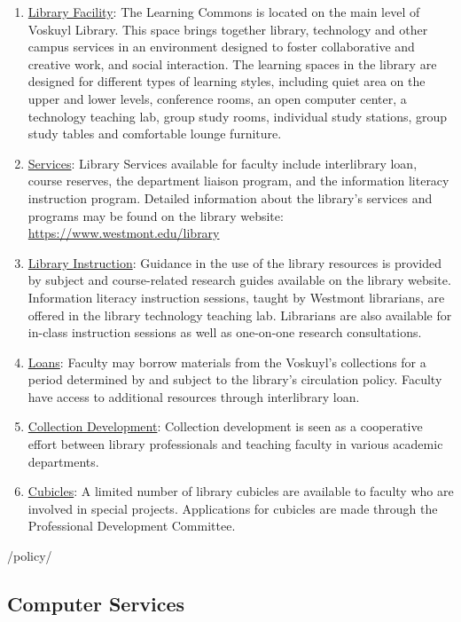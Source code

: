 		\begin{enumerate}[label=\alph*)]
			\item{\underline{Library Facility}:  The Learning Commons is located on the main level of Voskuyl Library.  This space brings together library, technology and other campus services in an environment designed to foster collaborative and creative work, and social interaction.  The learning spaces in the library are designed for different types of learning styles, including quiet area on the upper and lower levels, conference rooms, an open computer center, a technology teaching lab, group study rooms, individual study stations, group study tables and comfortable lounge furniture.
			}
			\item{\underline{Services}:  Library Services available for faculty include interlibrary loan, course reserves, the department liaison program, and the information literacy instruction program.  Detailed information about the library's services and programs may be found on the library website:
				\href{https://www.westmont.edu/library}{\url{https://www.westmont.edu/library}}}
			\item{\underline{Library Instruction}:  Guidance in the use of the library resources is provided by subject and course-related research guides available on the library website.  Information literacy instruction sessions, taught by Westmont librarians, are offered in the library technology teaching lab.  Librarians are also available for in-class instruction sessions as well as one-on-one research consultations.
			}
			\item{\underline{Loans}:  Faculty may borrow materials from the Voskuyl's collections for a period determined by and subject to the library's circulation policy.  Faculty have access to additional resources through interlibrary loan.
			}
			\item{\underline{Collection Development}:  Collection development is seen as a cooperative effort between library professionals and teaching faculty in various academic departments.
			}
			\item{\underline{Cubicles}:  A limited number of library cubicles are available to faculty who are involved in special projects.  Applications for cubicles are made through the Professional Development Committee.
			}
		\end{enumerate}/policy/

	\subsection{Computer Services}

